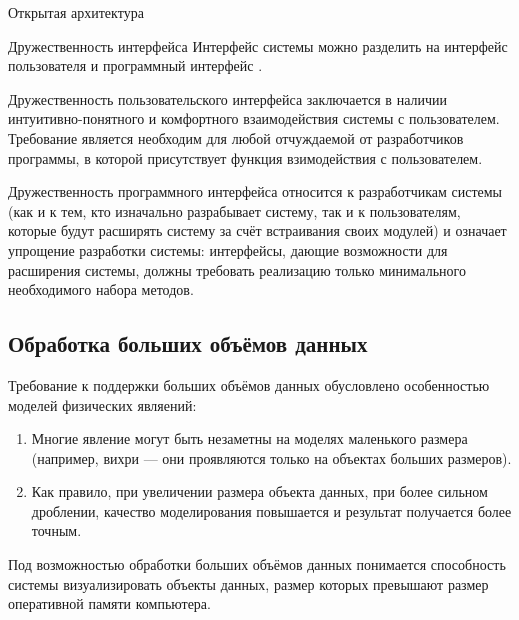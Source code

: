 \documentclass[a4paper,12pt]{extarticle}
\begin{document}
\begin{subsection}{Открытая архитектура}
    \begin{subsubsection}{Дружественность интерфейса}
        Интерфейс системы можно разделить на интерфейс пользователя и программный интерфейс \cite{ieee}.
        
        Дружественность пользовательского интерфейса заключается в наличии интуитивно-понятного и комфортного взаимодействия системы с пользователем. Требование является необходим для любой отчуждаемой от разработчиков программы, в которой присутствует функция взимодействия с пользователем.
        
        Дружественность программного интерфейса относится к разработчикам системы (как и к тем, кто изначально разрабывает систему, так и к пользователям, которые будут расширять систему за счёт встраивания своих модулей) и означает упрощение разработки системы: интерфейсы, дающие возможности для расширения системы, должны требовать реализацию только минимального необходимого набора методов.
    \end{subsubsection}

\end{subsection}

\subsection{Обработка больших объёмов данных}

Требование к поддержки больших объёмов данных обусловлено особенностью моделей физических являений:
\begin{enumerate}
    \item Многие явление могут быть незаметны на моделях маленького размера (например, вихри --- они проявляются только на объектах больших размеров).
    
    \item Как правило, при увеличении размера объекта данных, при более сильном дроблении, качество моделирования повышается и результат получается более точным.
\end{enumerate}

Под возможностью обработки больших объёмов данных понимается способность системы визуализировать объекты данных, размер которых превышают размер оперативной памяти компьютера.
\end{document}
